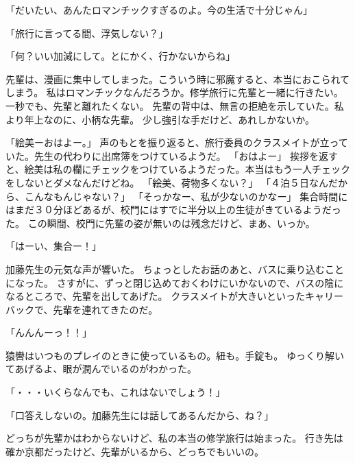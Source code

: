 「だいたい、あんたロマンチックすぎるのよ。今の生活で十分じゃん」

「旅行に言ってる間、浮気しない？」

「何？いい加減にして。とにかく、行かないからね」

先輩は、漫画に集中してしまった。こういう時に邪魔すると、本当におこられてしまう。
私はロマンチックなんだろうか。修学旅行に先輩と一緒に行きたい。一秒でも、先輩と離れたくない。
先輩の背中は、無言の拒絶を示していた。私より年上なのに、小柄な先輩。
少し強引な手だけど、あれしかないか。


「絵美ーおはよー。」
声のもとを振り返ると、旅行委員のクラスメイトが立っていた。先生の代わりに出席簿をつけているようだ。
「おはよー」
挨拶を返すと、絵美は私の欄にチェックをつけているようだった。本当はもう一人チェックをしないとダメなんだけどね。
「絵美、荷物多くない？」
「４泊５日なんだから、こんなもんじゃない？」
「そっかなー、私が少ないのかなー」
集合時間にはまだ３０分ほどあるが、校門にはすでに半分以上の生徒がきているようだった。
この瞬間、校門に先輩の姿が無いのは残念だけど、まあ、いっか。

「はーい、集合ー！」

加藤先生の元気な声が響いた。
ちょっとしたお話のあと、バスに乗り込むことになった。
さすがに、ずっと閉じ込めておくわけにいかないので、バスの陰になるところで、先輩を出してあげた。
クラスメイトが大きいといったキャリーバックで、先輩を連れてきたのだ。

「んんんーっ！！」

猿轡はいつものプレイのときに使っているもの。紐も。手錠も。
ゆっくり解いてあげるよ、眼が潤んでいるのがわかった。

「・・・いくらなんでも、これはないでしょう！」

「口答えしないの。加藤先生には話してあるんだから、ね？」

どっちが先輩かはわからないけど、私の本当の修学旅行は始まった。
行き先は確か京都だったけど、先輩がいるから、どっちでもいいの。
                                                                                                            




